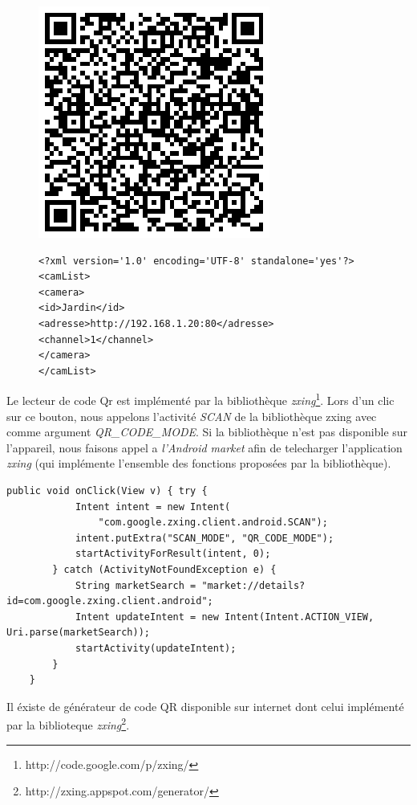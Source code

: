 \begin{figure}[H]
  \includegraphics{Images/chart.eps}
  \begin{lstlisting}[format=XML]
<?xml version='1.0' encoding='UTF-8' standalone='yes'?>
<camList>
<camera>
<id>Jardin</id>
<adresse>http://192.168.1.20:80</adresse>
<channel>1</channel>
</camera>
</camList>
\end{lstlisting}
\end{figure}

\indent Le lecteur de code Qr est implémenté par la bibliothèque
\textit{zxing}\footnote{\label{zxing} http://code.google.com/p/zxing/}. 
Lors d'un clic sur ce bouton, nous appelons l'activité 
\textit{SCAN} de la bibliothèque zxing avec comme argument
\textit{QR\_CODE\_MODE}.
Si la bibliothèque n'est pas disponible sur l'appareil, nous faisons appel a
\textit{l'Android market} afin de telecharger l'application \textit{zxing} (qui
implémente l'ensemble des fonctions proposées par la bibliothèque).
\newline
\begin{lstlisting}[caption={Lancement de l'activité zxing ou de l'Android
market.}] 
    public void onClick(View v) { try {
            Intent intent = new Intent(
                "com.google.zxing.client.android.SCAN");
            intent.putExtra("SCAN_MODE", "QR_CODE_MODE");
            startActivityForResult(intent, 0);
        } catch (ActivityNotFoundException e) {
            String marketSearch = "market://details?id=com.google.zxing.client.android";
            Intent updateIntent = new Intent(Intent.ACTION_VIEW, Uri.parse(marketSearch));
            startActivity(updateIntent);
        }
    }
\end{lstlisting}

\indent \newline
\indent Il éxiste de générateur de code QR disponible sur internet dont celui
implémenté par la biblioteque
\textit{zxing}\footnote{\label{zxingGenerator}
http://zxing.appspot.com/generator/}.

